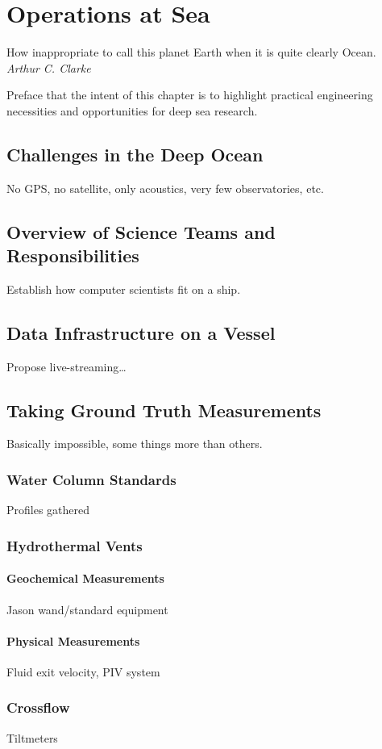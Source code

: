 \chapter{Operations at Sea}

\begin{center}
    \begin{minipage}{0.5\textwidth}
      \begin{small}
        How inappropriate to call this planet Earth when it is quite clearly Ocean.\\ \emph{Arthur C. Clarke}
      \end{small}
    \end{minipage}
    \vspace{0.5cm}
\end{center}

Preface that the intent of this chapter is to highlight practical engineering necessities and opportunities for deep sea research.

\section{Challenges in the Deep Ocean}
No GPS, no satellite, only acoustics, very few observatories, etc.

\section{Overview of Science Teams and Responsibilities}
Establish how computer scientists fit on a ship.

\section{Data Infrastructure on a Vessel}
Propose live-streaming\dots

\section{Taking Ground Truth Measurements}
Basically impossible, some things more than others.

\subsection{Water Column Standards}
Profiles gathered

\subsection{Hydrothermal Vents}

\subsubsection{Geochemical Measurements}
Jason wand/standard equipment

\subsubsection{Physical Measurements}
Fluid exit velocity, PIV system

\subsection{Crossflow}
Tiltmeters
